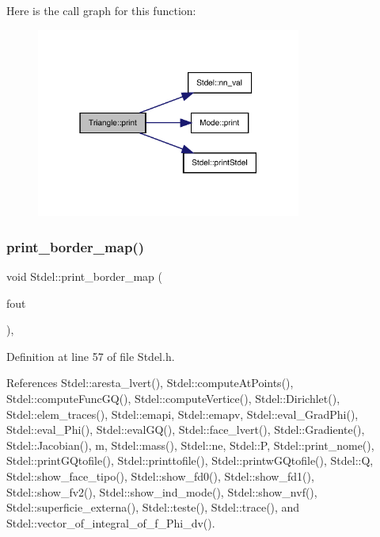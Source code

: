 Here is the call graph for this function\+:
\nopagebreak
\begin{figure}[H]
\begin{center}
\leavevmode
\includegraphics[width=247pt]{classTriangle_ad9159142cf526db5cf44035c62a1f927_cgraph}
\end{center}
\end{figure}
\mbox{\label{classStdel_a9a0c69dca7564f6ca4aa4f3c9864ea01}} 
\subsubsection{\texorpdfstring{print\+\_\+border\+\_\+map()}{print\_border\_map()}}
{\footnotesize\ttfamily void Stdel\+::print\+\_\+border\+\_\+map (\begin{DoxyParamCaption}\item[{F\+I\+LE $\ast$}]{fout }\end{DoxyParamCaption})\hspace{0.3cm}{\ttfamily [inline]}, {\ttfamily [inherited]}}



Definition at line 57 of file Stdel.\+h.



References Stdel\+::aresta\+\_\+lvert(), Stdel\+::compute\+At\+Points(), Stdel\+::compute\+Func\+G\+Q(), Stdel\+::compute\+Vertice(), Stdel\+::\+Dirichlet(), Stdel\+::elem\+\_\+traces(), Stdel\+::emapi, Stdel\+::emapv, Stdel\+::eval\+\_\+\+Grad\+Phi(), Stdel\+::eval\+\_\+\+Phi(), Stdel\+::eval\+G\+Q(), Stdel\+::face\+\_\+lvert(), Stdel\+::\+Gradiente(), Stdel\+::\+Jacobian(), m, Stdel\+::mass(), Stdel\+::ne, Stdel\+::P, Stdel\+::print\+\_\+nome(), Stdel\+::print\+G\+Qtofile(), Stdel\+::printtofile(), Stdel\+::printw\+G\+Qtofile(), Stdel\+::Q, Stdel\+::show\+\_\+face\+\_\+tipo(), Stdel\+::show\+\_\+fd0(), Stdel\+::show\+\_\+fd1(), Stdel\+::show\+\_\+fv2(), Stdel\+::show\+\_\+ind\+\_\+mode(), Stdel\+::show\+\_\+nvf(), Stdel\+::superficie\+\_\+externa(), Stdel\+::teste(), Stdel\+::trace(), and Stdel\+::vector\+\_\+of\+\_\+integral\+\_\+of\+\_\+f\+\_\+\+Phi\+\_\+dv().

